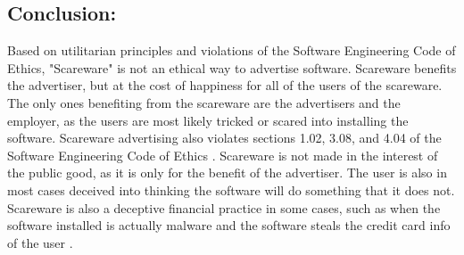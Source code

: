 \documentclass[11pt]{article}
\begin{document}
\begin{multicols}{2}
\subsection{Conclusion:}
Based on utilitarian principles and violations of the Software Engineering Code of Ethics, "Scareware" is not an ethical way to advertise software. Scareware benefits the advertiser, but at the cost of happiness for all of the users of the scareware. The only ones benefiting from the scareware are the advertisers and the employer, as the users are most likely tricked or scared into installing the software. Scareware advertising also violates sections 1.02, 3.08, and 4.04 of the Software Engineering Code of Ethics \cite{secode}. Scareware is not made in the interest of the public good, as it is only for the benefit of the advertiser. The user is also in most cases deceived into thinking the software will do something that it does not. Scareware is also a deceptive financial practice in some cases, such as when the software installed is actually malware and the software steals the credit card info of the user \cite{bbcmillionstricked}.

\end{multicols}
\newpage

\nocite{*}




\end{document}
